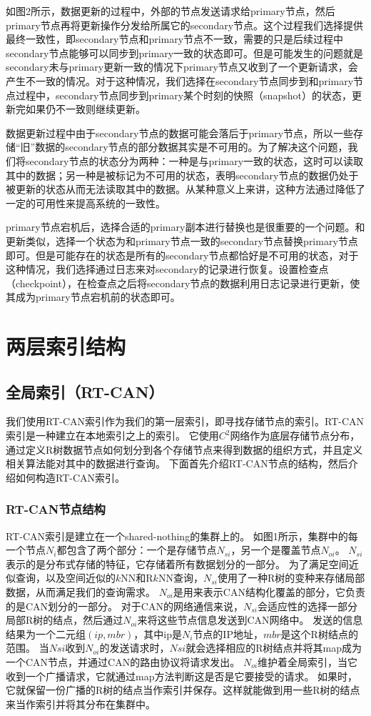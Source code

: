 \documentclass{ML}
\begin{document}
如图2所示，数据更新的过程中，外部的节点发送请求给primary节点，然后primary节点再将更新操作分发给所属它的secondary节点。这个过程我们选择提供最终一致性，即secondary节点和primary节点不一致，需要的只是后续过程中secondary节点能够可以同步到primary一致的状态即可。但是可能发生的问题就是secondary未与primary更新一致的情况下primary节点又收到了一个更新请求，会产生不一致的情况。对于这种情况，我们选择在secondary节点同步到和primary节点过程中，secondary节点同步到primary某个时刻的快照（snapshot）的状态，更新完如果仍不一致则继续更新。

数据更新过程中由于secondary节点的数据可能会落后于primary节点，所以一些存储“旧”数据的secondary节点的部分数据其实是不可用的。为了解决这个问题，我们将secondary节点的状态分为两种：一种是与primary一致的状态，这时可以读取其中的数据；另一种是被标记为不可用的状态，表明secondary节点的数据仍处于被更新的状态从而无法读取其中的数据。从某种意义上来讲，这种方法通过降低了一定的可用性来提高系统的一致性。

primary节点宕机后，选择合适的primary副本进行替换也是很重要的一个问题。和更新类似，选择一个状态为和primary节点一致的secondary节点替换primary节点即可。但是可能存在的状态是所有的secondary节点都恰好是不可用的状态，对于这种情况，我们选择通过日志来对secondary的记录进行恢复。设置检查点（checkpoint），在检查点之后将secondary节点的数据利用日志记录进行更新，使其成为primary节点宕机前的状态即可。

\section{两层索引结构}
\subsection{全局索引（RT-CAN）}
我们使用RT-CAN索引作为我们的第一层索引，即寻找存储节点的索引。RT-CAN索引是一种建立在本地索引之上的索引\cite{RT-CAN}。
它使用$C^2$网络作为底层存储节点分布，通过定义R树数据节点如何划分到各个存储节点来得到数据的组织方式，并且定义相关算法能对其中的数据进行查询。
下面首先介绍RT-CAN节点的结构，然后介绍如何构造RT-CAN索引。

\subsubsection{RT-CAN节点结构}
RT-CAN索引是建立在一个shared-nothing的集群上的。
如图1所示，集群中的每一个节点$N_i$都包含了两个部分：一个是存储节点$N_{si}$，另一个是覆盖节点$N_{oi}$。
$N_{si}$表示的是分布式存储的特征，它存储着所有数据划分的一部分。
为了满足空间近似查询，以及空间近似的$k$NN和R$k$NN查询，$N_{si}$使用了一种R树的变种来存储局部数据，从而满足我们的查询需求。
$N_{oi}$是用来表示CAN结构化覆盖的部分，它负责的是CAN划分的一部分。
对于CAN的网络通信来说，$N_{si}$会适应性的选择一部分局部R树的结点，然后通过$N_{oi}$来将这些节点信息发送到CAN网络中。
发送的信息结果为一个二元组$(ip,mbr)$，其中ip是$N_i$节点的IP地址，$mbr$是这个R树结点的范围。
当$N{si}$收到$N_{oi}$的发送请求时，$N{si}$就会选择相应的R树结点并将其map成为一个CAN节点，并通过CAN的路由协议将请求发出。
$N_{oi}$维护着全局索引，当它收到一个广播请求，它就通过map方法判断这是否是它要接受的请求。
如果时，它就保留一份广播的R树的结点当作索引并保存。这样就能做到用一些R树的结点来当作索引并将其分布在集群中。
\end{document}

